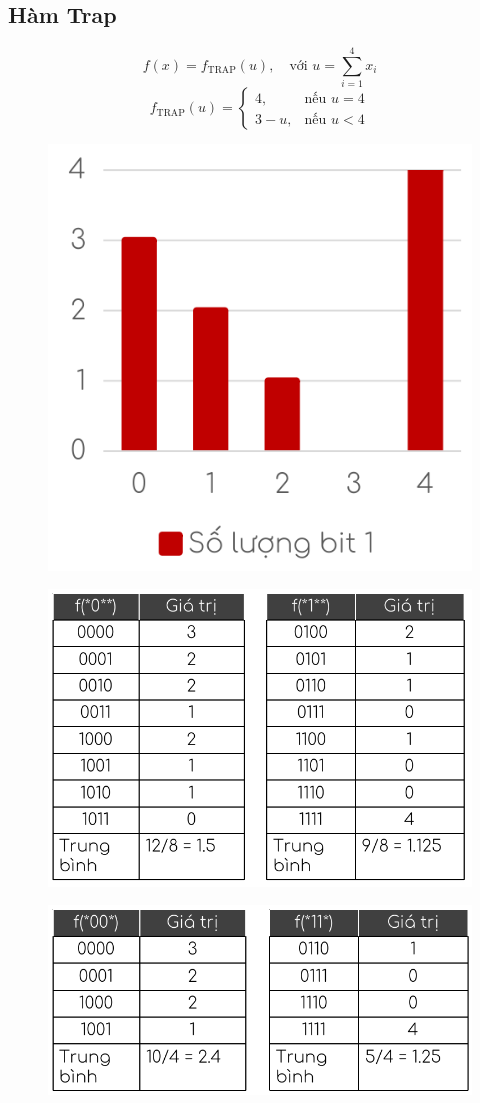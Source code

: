 \documentclass{book}
\begin{document}
        \subsection{Hàm Trap}
        
        \[
        f(x) = f_{\text{TRAP}}(u), \quad \text{với } u = \sum_{i=1}^{4} x_i
        \]
        \[
        f_{\text{TRAP}}(u) =
        \begin{cases}
            4, & \text{nếu } u = 4 \\
            3 - u, & \text{nếu } u < 4
        \end{cases}
        \]
        \begin{figure}[H]
            \centering
            \includegraphics[width=0.3\linewidth]{images/trapbit.png}
            \label{fig:trapbit}
        \end{figure}
        \begin{figure}[H]
            \centering
            \includegraphics[width=0.6\linewidth]{images/trapt1.png}
            \label{fig:trapt1}
        \end{figure}
        \begin{figure}[H]
            \centering
            \includegraphics[width=0.6\linewidth]{images/trapt2.png}
            \label{fig:trapt2}
        \end{figure}
\end{document}
